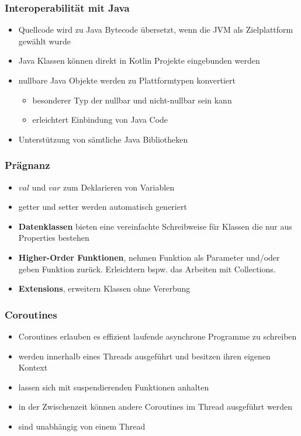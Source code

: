 \documentclass{beamer}
\begin{document}
\begin{frame}
\frametitle{Interoperabilität mit Java}
\begin{itemize}
\onehalfspacing
    \item Quellcode wird zu Java Bytecode übersetzt, wenn die JVM als Zielplattform gewählt wurde
    \item Java Klassen können direkt in Kotlin Projekte eingebunden werden
    \item nullbare Java Objekte werden zu Plattformtypen konvertiert
    \begin{itemize}
        \item besonderer Typ der nullbar und nicht-nullbar sein kann
        \item erleichtert Einbindung von Java Code
    \end{itemize}
    \item Unterstützung von sämtliche Java Bibliotheken
\end{itemize}
\end{frame}

\begin{frame}
\frametitle{Prägnanz}
\begin{itemize}
\onehalfspacing
    \item $val$ und $var$ zum Deklarieren von Variablen
    \item getter und setter werden automatisch generiert
    \item \textbf{Datenklassen} bieten eine vereinfachte Schreibweise für Klassen die nur aus Properties bestehen
    \item \textbf{Higher-Order Funktionen}, nehmen Funktion als Parameter und/oder geben Funktion zurück. Erleichtern bspw. das Arbeiten mit Collections.
    \item \textbf{Extensions}, erweitern Klassen ohne Vererbung
\end{itemize}
\end{frame}


\begin{frame}
\frametitle{Coroutines}
\begin{itemize}
    \item Coroutines erlauben es effizient laufende asynchrone Programme zu schreiben
    \item werden innerhalb eines Threads ausgeführt und besitzen ihren eigenen Kontext
    \item lassen sich mit suspendierenden Funktionen anhalten
    \item in der Zwischenzeit können andere Coroutines im Thread ausgeführt werden
    \item sind unabhängig von einem Thread
\end{itemize}
\end{frame}
\end{document}
